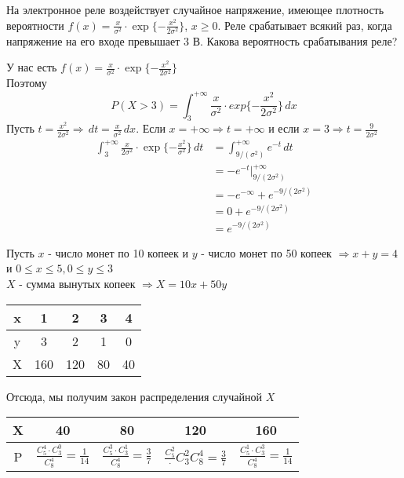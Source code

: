 \begin{exercise}[2] На электронное реле воздействует случайное напряжение, имеющее плотность вероятности $f(x) = \frac{x}{\sigma^2} \cdot \exp\{-\frac{x^2}{2\sigma^2}\}$, $x \geq 0$. Реле срабатывает всякий раз, когда напряжение на его входе превышает 3 В. Какова вероятность срабатывания реле?
	
	У нас есть $f(x) = \frac{x}{\sigma^2} \cdot \exp\{-\frac{x^2}{2\sigma^2}\}$ \\ Поэтому $$P(X > 3) = \int_{3}^{+\infty} \frac{x}{\sigma^2} \cdot exp\{-\frac{x^2}{2\sigma^2}\}\,dx$$
	Пусть $t=\frac{x^2}{2\sigma^2} \Rightarrow \,dt = \frac{x}{\sigma^2} \,dx$. Если $x=+\infty \Rightarrow t = +\infty$ и если $x=3 \Rightarrow t = \frac{9}{2\sigma^2}$
	\begin{align*}
		\int_{3}^{+\infty} \frac{x}{2\sigma^2} \cdot \exp\{-\frac{x^2}{\sigma^2}\} \,dt & = \int_{9/(\sigma^2)}^{+\infty} e^{-t} \,dt \\ & = -e^{-t} |^{+\infty}_{9/(2\sigma^2)} \\ & = -e^{-\infty} + e^{-9/(2\sigma^2)} \\ & = 0 + e^{-9/(2\sigma^2)} \\ & = e^{-9/(2\sigma^2)}
	\end{align*}
\end{exercise}

\begin{exercise}[3]
	Пусть $x$ - число монет по 10 копеек и $y$ - число монет по 50 копеек $\Rightarrow x + y = 4$ и $0 \leq x \leq 5, 0 \leq y \leq 3$ \\ $X$ - сумма вынутых копеек $\Rightarrow X = 10x + 50y$
	\begin{center}
		\begin{tabular}{| c  | c | c | c | c |}
			\hline
			x  & 1 & 2 & 3 & 4 \\
			\hline
			y  & 3 & 2 & 1 & 0 \\
			\hline
			X & 160 & 120 & 80 & 40 \\
			\hline
		\end{tabular}
	\end{center} 
	Отсюда, мы получим закон распределения случайной $X$
	\begin{center}
		\begin{tabular}{|c | c | c | c | c |}
			\hline
			X & 40 & 80 & 120 & 160 \\ \hline
			P & $\frac{C^4_5 \cdot C^0_3}{C^4_8} = \frac{1}{14}$ & $\frac{C^3_5 \cdot C^1_3}{C^4_8} = \frac{3}{7}$ & $\frac{C^2_5} \cdot C^2_3{C^4_8} = \frac{3}{7}$ & $\frac{C^1_5 \cdot C^3_3}{C^4_8} = \frac{1}{14}$ \\ \hline
		\end{tabular}
	\end{center}
\end{exercise}

